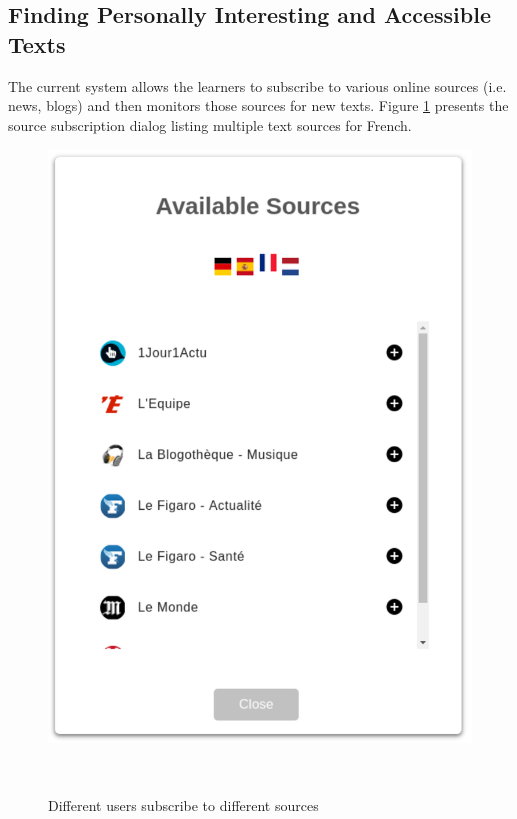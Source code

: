 


  

\subsection{Finding Personally Interesting and Accessible Texts}
The current system allows the learners to subscribe to various online sources (i.e. news, blogs) and then monitors those sources for new texts. Figure \ref{fig:system_subscriptions} presents the source subscription dialog listing multiple text sources for French.



    \begin{figure}[h!]
    \centering
      \includegraphics[width=0.3\columnwidth]{figures/available_sources}
      \caption{Different users subscribe to different sources}~\label{fig:system_subscriptions}
    \end{figure}

